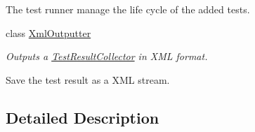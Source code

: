 \begin{DoxyCompactItemize}
\begin{DoxyCompactList}
The test runner manage the life cycle of the added tests. \end{DoxyCompactList}\item 
class \hyperlink{class_xml_outputter}{Xml\+Outputter}
\begin{DoxyCompactList}\small\item\em Outputs a \hyperlink{class_test_result_collector}{Test\+Result\+Collector} in X\+M\+L format.

Save the test result as a X\+M\+L stream. \end{DoxyCompactList}\end{DoxyCompactItemize}


\subsection{Detailed Description}
